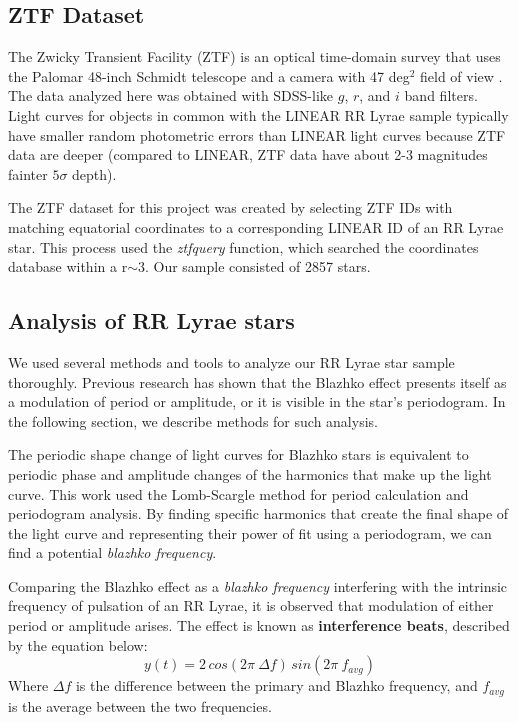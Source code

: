 \documentclass{aa}
\begin{document}
\subsection{ZTF Dataset}

The Zwicky Transient Facility (ZTF) is an optical time-domain survey that uses the Palomar 48-inch Schmidt telescope
and a camera with 47 deg$^2$ field of view \citep{2019PASP..131a8002B}. The data analyzed here was obtained with
SDSS-like $g$, $r$, and $i$ band filters. Light curves for objects in common with the LINEAR RR Lyrae sample typically
have smaller random photometric errors than LINEAR light curves because ZTF data are deeper (compared to LINEAR,
ZTF data have about 2-3 magnitudes fainter  $5\sigma$ depth).

The ZTF dataset for this project was created by selecting ZTF IDs with matching equatorial coordinates to a corresponding LINEAR ID of an RR Lyrae star. This process used the {\it ztfquery} function, which searched the coordinates database within a r$\sim$3. Our sample consisted of 2857 stars. 

\subsection{Analysis of RR Lyrae stars}

We used several methods and tools to analyze our RR Lyrae star sample thoroughly. Previous research has shown that the Blazhko effect presents itself as a modulation of period or amplitude, or it is visible in the star's periodogram. In the following section, we describe methods for such analysis.

The periodic shape change of light curves for Blazhko stars is equivalent to periodic phase and amplitude changes of the
harmonics that make up the light curve. This work used the Lomb-Scargle method for period calculation and periodogram analysis. By finding specific harmonics that create the final shape of the light curve and representing their power of fit using a periodogram, we can find a potential {\it blazhko frequency}.

Comparing the Blazhko effect as a {\it blazhko frequency} interfering with the intrinsic frequency of pulsation of an RR Lyrae, it is observed that modulation of either period or amplitude arises. The effect is known as \textbf{interference beats}, described by the equation below:
\begin{equation*}
    y(t) = 2 \, cos(2\pi \ \Delta f) \, sin(2\pi \ f_{avg})
\end{equation*}
Where $\Delta f$ is the difference between the primary and Blazhko frequency, and $f_{avg}$ is the average between the two frequencies.
\end{document}
